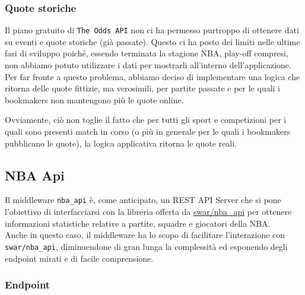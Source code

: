 \subsubsection{Quote storiche}
Il piano gratuito di \texttt{The Odds API} non ci ha permesso purtroppo di ottenere dati su eventi e quote storiche (già passate). Questo ci ha posto dei limiti nelle ultime fasi di sviluppo poiché, essendo terminata la stagione NBA, play-off compresi, non abbiamo potuto utilizzare i dati per mostrarli all'interno dell'applicazione.\\
Per far fronte a questo problema, abbiamo deciso di implementare una logica che ritorna delle quote fittizie, ma verosimili, per partite passate e per le quali i bookmakers non mantengono più le quote online. 

Ovviamente, ciò non toglie il fatto che per tutti gli sport e competizioni per i quali sono presenti match in corso (o più in generale per le quali i bookmakers pubblicano le quote), la logica applicativa ritorna le quote reali.



\subsection{NBA Api}

Il middleware \texttt{nba\_api} è, come anticipato, un REST API Server che si pone l'obiettivo di interfacciarsi con la libreria offerta da \href{https://github.com/swar/nba_api}{swar/nba\_api} per ottenere informazioni statistiche relative a partite, squadre e giocatori della NBA.\\
Anche in questo caso, il middleware ha lo scopo di facilitare l'interazione con \texttt{swar/nba\_api}, diminuendone di gran lunga la complessità ed esponendo degli endpoint mirati e di facile comprensione.

\subsubsection{Endpoint}

